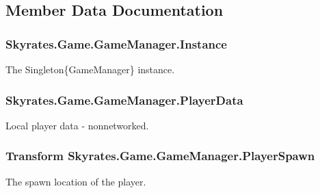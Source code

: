 \subsection{Member Data Documentation}
\hypertarget{class_skyrates_1_1_game_1_1_game_manager_a5b1ce44932689e2e4b3ca18a238cc22e}{
\subsubsection[{Instance}]{ Skyrates.\-Game.\-Game\-Manager.\-Instance\hspace{0.3cm}{\ttfamily [static]}}}\label{class_skyrates_1_1_game_1_1_game_manager_a5b1ce44932689e2e4b3ca18a238cc22e}


The Singleton\{\-Game\-Manager\} instance. 

\hypertarget{class_skyrates_1_1_game_1_1_game_manager_ad66cf44da1b4400f74853a247987a5df}{
\subsubsection[{Player\-Data}]{ Skyrates.\-Game.\-Game\-Manager.\-Player\-Data}}\label{class_skyrates_1_1_game_1_1_game_manager_ad66cf44da1b4400f74853a247987a5df}


Local player data -\/ nonnetworked. 

\hypertarget{class_skyrates_1_1_game_1_1_game_manager_ad4e11d1ee870d356ef6c38294f5d5e16}{
\subsubsection[{Player\-Spawn}]{\setlength{\rightskip}{0pt plus 5cm}Transform Skyrates.\-Game.\-Game\-Manager.\-Player\-Spawn}}\label{class_skyrates_1_1_game_1_1_game_manager_ad4e11d1ee870d356ef6c38294f5d5e16}


The spawn location of the player. 




